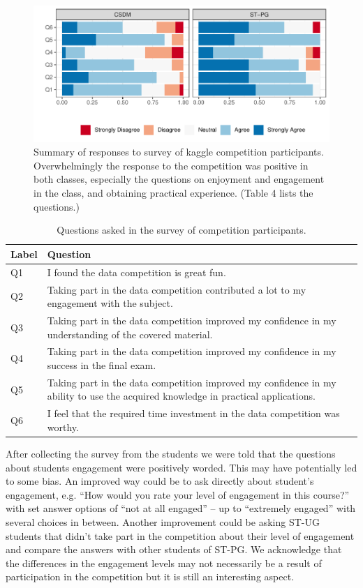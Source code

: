 \documentclass[12pt]{article}
\begin{document}
\begin{figure}
\centering
\includegraphics{paper-kaggle_files/figure-latex/likert-1.pdf}
\caption{\label{fig:likert}Summary of responses to survey of kaggle
competition participants. Overwhelmingly the response to the competition
was positive in both classes, especially the questions on enjoyment and
engagement in the class, and obtaining practical experience. (Table 4
lists the questions.)}
\end{figure}

\begin{table}[b!]
\begin{center}
\begin{tabular}{|l|p{15cm}|}\hline
Label & Question \\\hline
Q1 & I found the data competition is great fun.\\\hline
Q2 & Taking part in the data competition contributed a lot to my engagement with the subject.\\\hline
Q3 & Taking part in the data competition improved my confidence in my understanding of the covered material.\\\hline
Q4 & Taking part in the data competition improved my confidence in my success in the final exam.\\\hline
Q5 & Taking part in the data competition improved my confidence in my ability to use the acquired knowledge in practical applications.\\\hline
Q6 & I feel that the required time investment in the data competition was worthy. \\\hline
\end{tabular}
\end{center}
\caption{Questions asked in the survey of competition participants.}
\label{survey_Q}
\end{table}

After collecting the survey from the students we were told that the
questions about students engagement were positively worded. This may
have potentially led to some bias. An improved way could be to ask
directly about student's engagement, e.g. ``How would you rate your
level of engagement in this course?'' with set answer options of ``not
at all engaged'' -- up to ``extremely engaged'' with several choices in
between. Another improvement could be asking ST-UG students that didn't
take part in the competition about their level of engagement and compare
the answers with other students of ST-PG. We acknowledge that the
differences in the engagement levels may not necessarily be a result of
participation in the competition but it is still an interesting aspect.
\end{document}
